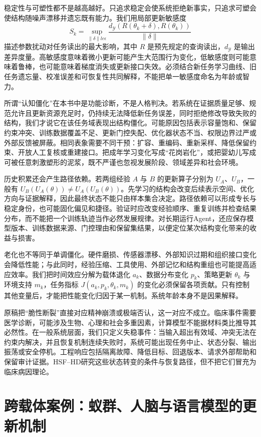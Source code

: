 稳定性与可塑性都不是越高越好。只追求稳定会使系统拒绝新事实，只追求可塑会使结构随噪声漂移并遗忘既有能力。我们用局部更新敏感度
\[
S_k=\sup_{\|\delta\|le\epsilon}
\frac{d_{\mathcal Y}(R(\theta_k+\delta),R(\theta_k))}{\|\delta\|}
\]
描述参数扰动对任务读出的最大影响，其中 $R$ 是预先规定的查询读出，$d_{\mathcal Y}$ 是输出差异度量。高敏感度意味着微小更新可能产生大范围行为变化，低敏感度则可能意味着鲁棒，也可能意味着梯度消失或更新接口失效。必须结合新任务学习曲线、旧任务遗忘量、校准误差和可恢复性共同解释，不能把单一敏感度命名为年龄或智力。

所谓“认知僵化”在本书中是功能诊断，不是人格判决。若系统在证据质量足够、规范允许且更新资源充足时，仍持续无法降低新任务误差，同时拒绝修改导致失败的结构，我们才说它在该任务域表现出结构僵化。可能原因包括表示容量饱和、保留约束冲突、训练数据覆盖不足、更新门控失配、优化器状态不当、权限边界过严或外部反馈被屏蔽。相同表象需要不同干预：扩容、重编码、重新采样、降低保留约束、开放人工复核或重建接口。把成年学习变化写成“花岗岩化”，或把婴幼儿写成可被任意刺激塑形的泥浆，既不严谨也忽视发展阶段、领域差异和社会环境。

历史积累还会产生路径依赖。若两组经验 $A$ 与 $B$ 的更新算子分别为 $U_A$、$U_B$，一般有 $U_B(U_A(\theta))\ne U_A(U_B(\theta))$。先学习的结构会改变后续表示空间、优化方向与证据解释，因此最终状态不能只由样本集合决定。路径依赖可以形成专长与稳定身份，也可能固化偏见和捷径。验证时应改变经验顺序、重复训练并检查结果分布，而不能把一个训练轨迹当作必然发展规律。对长期运行Agent，还应保存模型版本、训练数据来源、门控理由和保留集结果，以便定位某次结构变化带来的收益与损害。

老化也不等同于单调僵化。硬件磨损、传感器漂移、外部知识过期和组织接口变化会降低性能；与此同时，经验压缩、工具使用、外部记忆和结构重组也可能提高适应效率。我们把时间效应分解为载体退化 $a_k$、数据分布变化 $p_k$、策略更新 $\theta_k$ 与环境支持 $m_k$，任务指标 $J(a_k,p_k,\theta_k,m_k)$ 的变化必须保留各项贡献。只有控制其他变量后，才能把性能变化归因于某一机制。系统年龄本身不是因果解释。

原稿把“脆性断裂”直接对应精神崩溃或极端否认，这一对应不成立。临床事件需要医学诊断，可能涉及生物、心理和社会多重因素，计算模型不能据材料类比推导其必然性。在一般系统层面，我们只定义失稳事件：当输入超出有效域、冲突无法在约束内解决，并且恢复机制连续失败时，系统可能出现任务中止、状态分裂、输出振荡或安全停机。工程响应包括隔离故障、降低目标、回退版本、请求外部帮助和保留审计证据。HSF--HD研究这些状态转变的条件与恢复路径，但不把它们冒充为临床病因理论。

\section{跨载体案例：蚁群、人脑与语言模型的更新机制}
\label{sec:material_case_studies}

